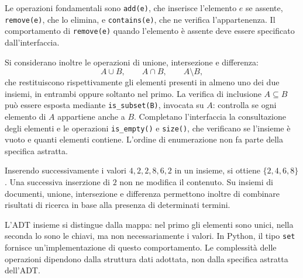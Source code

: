 Le operazioni fondamentali sono \texttt{add(e)}, che inserisce
l'elemento \(e\) se assente, \texttt{remove(e)}, che lo elimina,
e \texttt{contains(e)}, che ne verifica l'appartenenza.
Il comportamento di \texttt{remove(e)} quando l'elemento è assente
deve essere specificato dall'interfaccia.

Si considerano inoltre le operazioni di unione, intersezione
e differenza:
\[
  A\cup B,\qquad A\cap B,\qquad A\setminus B,
\]
che restituiscono rispettivamente gli elementi presenti in almeno
uno dei due insiemi, in entrambi oppure soltanto nel primo.
La verifica di inclusione \(A\subseteq B\) può essere esposta
mediante \texttt{is\_subset(B)}, invocata su \(A\): controlla
se ogni elemento di \(A\) appartiene anche a \(B\).
Completano l'interfaccia la consultazione degli elementi e le
operazioni \texttt{is\_empty()} e \texttt{size()}, che verificano
se l'insieme è vuoto e quanti elementi contiene.
L'ordine di enumerazione non fa parte della specifica astratta.

\begin{example}
Inserendo successivamente i valori \(4,2,2,8,6,2\) in un insieme,
si ottiene \(\{2,4,6,8\}\). Una successiva inserzione di \(2\)
non ne modifica il contenuto. Su insiemi di documenti, unione,
intersezione e differenza permettono inoltre di combinare risultati
di ricerca in base alla presenza di determinati termini.
\end{example}

L'ADT insieme si distingue dalla mappa: nel primo gli elementi
sono unici, nella seconda lo sono le chiavi, ma non necessariamente
i valori.
In Python, il tipo \texttt{set} fornisce un'implementazione
di questo comportamento. Le complessità delle operazioni
dipendono dalla struttura dati adottata, non dalla specifica
astratta dell'ADT.
